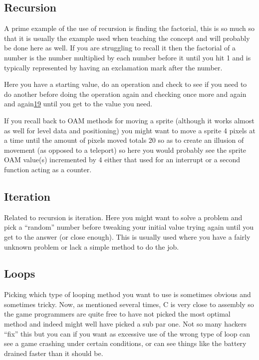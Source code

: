 \documentclass[
]{book}
\begin{document}
\hypertarget{recursion}{%
\subsection{Recursion}\label{recursion}}

A prime example of the use of recursion is finding the factorial, this is so much so that it is usually the example used when teaching the concept and will probably be done here as well. If you are struggling to recall it then the factorial of a number is the number multiplied by each number before it until you hit 1 and is typically represented by having an exclamation mark after the number.

Here you have a starting value, do an operation and check to see if you need to do another before doing the operation again and checking once more and again and again\href{romhacking202020.html\#fn19x0}{19} until you get to the value you need.

If you recall back to OAM methods for moving a sprite (although it works almost as well for level data and positioning) you might want to move a sprite 4 pixels at a time until the amount of pixels moved totals 20 so as to create an illusion of movement (as opposed to a teleport) so here you would probably see the sprite OAM value(s) incremented by 4 either that used for an interrupt or a second function acting as a counter.

\hypertarget{iteration}{%
\subsection{Iteration}\label{iteration}}

Related to recursion is iteration. Here you might want to solve a problem and pick a ``random'' number before tweaking your initial value trying again until you get to the answer (or close enough). This is usually used where you have a fairly unknown problem or lack a simple method to do the job.

\hypertarget{loops}{%
\subsection{Loops}\label{loops}}

Picking which type of looping method you want to use is sometimes obvious and sometimes tricky. Now, as mentioned several times, C is very close to assembly so the game programmers are quite free to have not picked the most optimal method and indeed might well have picked a sub par one. Not so many hackers ``fix'' this but you can if you want as excessive use of the wrong type of loop can see a game crashing under certain conditions, or can see things like the battery drained faster than it should be.
\end{document}
